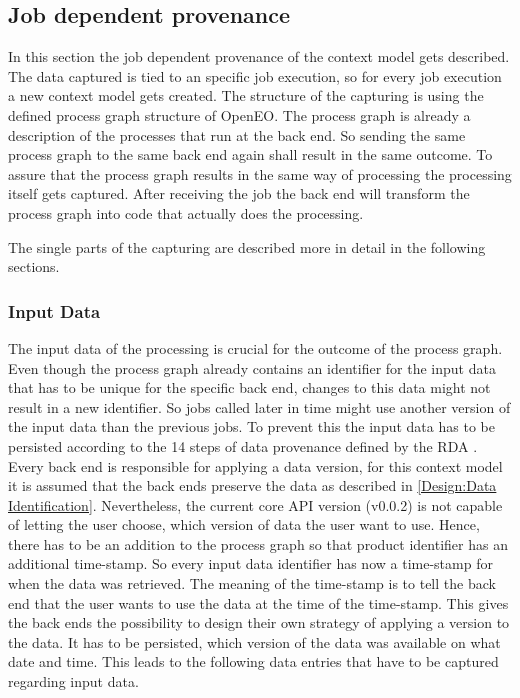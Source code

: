 \documentclass[draft,final]{vutinfth} %
\begin{document}
\subsection{Job dependent provenance}\label{Design:Job dependent provenance}
In this section the job dependent provenance of the context model gets described. The data captured is tied to an specific job execution, so for every job execution a new context model gets created. The structure of the capturing is using the defined process graph structure of OpenEO. The process graph is already a description of the processes that run at the back end. So sending the same process graph to the same back end again shall result in the same outcome. To assure that the process graph results in the same way of processing the processing itself gets captured. After receiving the job the back end will transform the process graph into code that actually does the processing. %


The single parts of the capturing are described more in detail in the following sections. 

\subsubsection{Input Data}\label{Design:Input Data}
The input data of the processing is crucial for the outcome of the process graph. Even though the process graph already contains an identifier for the input data that has to be unique for the specific back end, changes to this data might not result in a new identifier. So jobs called later in time might use another version of the input data than the previous jobs. To prevent this the input data has to be persisted according to the 14 steps of data provenance defined by the RDA \cite{rauber2016identification}. Every back end is responsible for applying a data version, for this context model it is assumed that the back ends preserve the data as described in \ref{Design:Data Identification}. Nevertheless, the current core API version (v0.0.2) is not capable of letting the user choose, which version of data the user want to use. Hence, there has to be an addition to the process graph so that product identifier has an additional time-stamp. So every input data identifier has now a time-stamp for when the data was retrieved. The meaning of the time-stamp is to tell the back end that the user wants to use the data at the time of the time-stamp. This gives the back ends the possibility to design their own strategy of applying a version to the data. It has to be persisted, which version of the data was available on what date and time. This leads to the following data entries that have to be captured regarding input data.
\end{document}
